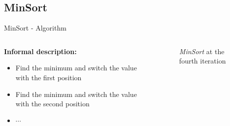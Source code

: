 \subsection{MinSort}

\begin{frame}{MinSort - Algorithm}
  \begin{columns}
    \begin{column}{0.5\textwidth}
      \textbf{Informal description:}
      \begin{itemize}
        \item
          Find the minimum and switch the value with the
          {\color{Mittel-Blau}first} position
        \item
          Find the minimum and switch the value with the
          {\color{Mittel-Blau}second} position
        \item
          $\cdots$
      \end{itemize}
    \end{column}
    \begin{column}{0.5\textwidth}
      \begin{figure}[!h]%
        \begin{adjustbox}{width=\linewidth}
        \end{adjustbox}
        \caption{\textit{MinSort} at the fourth iteration}%
        \label{fig:minsort_fourth_iteration}%
      \end{figure}%
    \end{column}
  \end{columns}
\end{frame}





